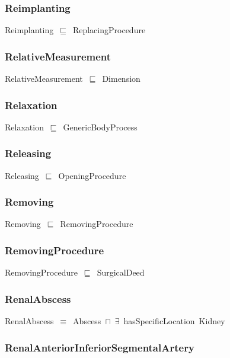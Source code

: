\documentclass{article}
\begin{document}
\subsubsection*{Reimplanting}

Reimplanting~\ensuremath{\sqsubseteq}~ReplacingProcedure~

\subsubsection*{RelativeMeasurement}

RelativeMeasurement~\ensuremath{\sqsubseteq}~Dimension~

\subsubsection*{Relaxation}

Relaxation~\ensuremath{\sqsubseteq}~GenericBodyProcess~

\subsubsection*{Releasing}

Releasing~\ensuremath{\sqsubseteq}~OpeningProcedure~

\subsubsection*{Removing}

Removing~\ensuremath{\sqsubseteq}~RemovingProcedure~

\subsubsection*{RemovingProcedure}

RemovingProcedure~\ensuremath{\sqsubseteq}~SurgicalDeed~

\subsubsection*{RenalAbscess}

RenalAbscess~\ensuremath{\equiv}~Abscess~\ensuremath{\sqcap}~\ensuremath{\exists}~hasSpecificLocation~Kidney

\subsubsection*{RenalAnteriorInferiorSegmentalArtery}
\end{document}
